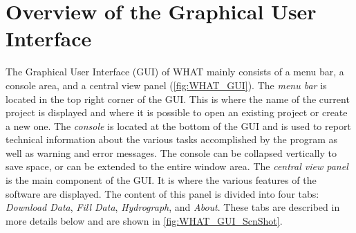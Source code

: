 \documentclass[WHATMANUAL.tex]{subfiles}
\begin{document}
\section{Overview of the Graphical User Interface}
\label{sec:GUI_overview}


The Graphical User Interface (GUI) of WHAT mainly consists of a menu bar, a console area, and a central view panel (\cref{fig:WHAT_GUI}). The \emph{menu bar} is located in the top right corner of the GUI. This is where the name of the current project is displayed and where it is possible to open an existing project or create a new one. The \emph{console} is located at the bottom of the GUI and is used to report technical information about the various tasks accomplished by the program as well as warning and error messages. The console can be collapsed vertically to save space, or can be extended to the entire window area. The \emph{central view panel} is the main component of the GUI. It is where the various features of the software are displayed. The content of this panel is divided into four tabs: \emph{Download Data}, \emph{Fill Data}, \emph{Hydrograph}, and \emph{About}. These tabs are described in more details below and are shown in \cref{fig:WHAT_GUI_ScnShot}.

\begin{figure}[!th]
    \setlength{\fboxsep}{0pt}
    {
    }
\end{figure}
\end{document}
